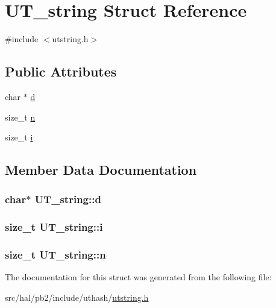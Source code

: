 \hypertarget{struct_u_t__string}{}\section{U\+T\+\_\+string Struct Reference}
\label{struct_u_t__string}


{\ttfamily \#include $<$utstring.\+h$>$}

\subsection*{Public Attributes}
\begin{DoxyCompactItemize}
\item 
char $\ast$ \hyperlink{struct_u_t__string_ae8062f7fa4067676e9d74ca2b2923ff9}{d}
\item 
size\+\_\+t \hyperlink{struct_u_t__string_a85161591fe87dd4be9cc031e282ffc1f}{n}
\item 
size\+\_\+t \hyperlink{struct_u_t__string_aa78df8b7c6db840e406431e5cb8941be}{i}
\end{DoxyCompactItemize}


\subsection{Member Data Documentation}
\subsubsection[{\texorpdfstring{d}{d}}]{\setlength{\rightskip}{0pt plus 5cm}char$\ast$ U\+T\+\_\+string\+::d}\hypertarget{struct_u_t__string_ae8062f7fa4067676e9d74ca2b2923ff9}{}\label{struct_u_t__string_ae8062f7fa4067676e9d74ca2b2923ff9}
\subsubsection[{\texorpdfstring{i}{i}}]{\setlength{\rightskip}{0pt plus 5cm}size\+\_\+t U\+T\+\_\+string\+::i}\hypertarget{struct_u_t__string_aa78df8b7c6db840e406431e5cb8941be}{}\label{struct_u_t__string_aa78df8b7c6db840e406431e5cb8941be}
\subsubsection[{\texorpdfstring{n}{n}}]{\setlength{\rightskip}{0pt plus 5cm}size\+\_\+t U\+T\+\_\+string\+::n}\hypertarget{struct_u_t__string_a85161591fe87dd4be9cc031e282ffc1f}{}\label{struct_u_t__string_a85161591fe87dd4be9cc031e282ffc1f}


The documentation for this struct was generated from the following file\+:\begin{DoxyCompactItemize}
\item 
src/hal/pb2/include/uthash/\hyperlink{utstring_8h}{utstring.\+h}\end{DoxyCompactItemize}
